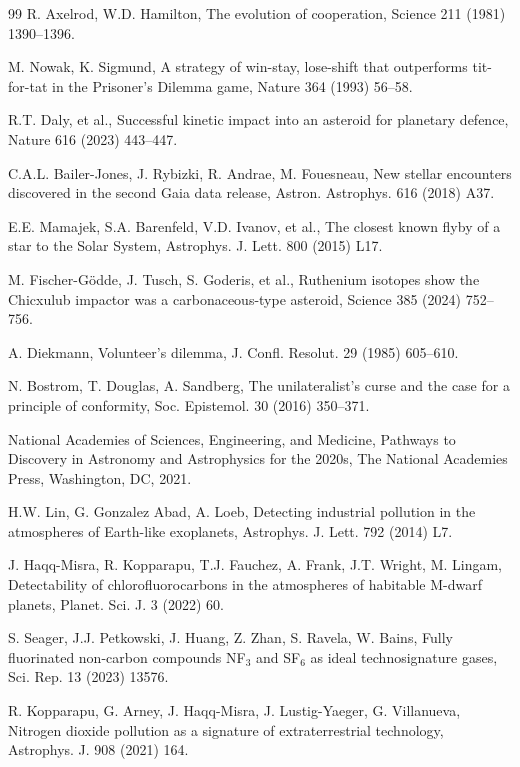 \documentclass[preprint,12pt]{elsarticle}
\theoremstyle{definition}
\begin{document}
\begin{thebibliography}{99}
 R. Axelrod, W.D. Hamilton, The evolution of cooperation, Science 211 (1981) 1390--1396.

 M. Nowak, K. Sigmund, A strategy of win-stay, lose-shift that outperforms tit-for-tat in the Prisoner's Dilemma game, Nature 364 (1993) 56--58.

 R.T. Daly, et al., Successful kinetic impact into an asteroid for planetary defence, Nature 616 (2023) 443--447.

 C.A.L. Bailer-Jones, J. Rybizki, R. Andrae, M. Fouesneau, New stellar encounters discovered in the second Gaia data release, Astron. Astrophys. 616 (2018) A37.

 E.E. Mamajek, S.A. Barenfeld, V.D. Ivanov, et al., The closest known flyby of a star to the Solar System, Astrophys. J. Lett. 800 (2015) L17.

 M. Fischer-G\"odde, J. Tusch, S. Goderis, et al., Ruthenium isotopes show the Chicxulub impactor was a carbonaceous-type asteroid, Science 385 (2024) 752--756.

 A. Diekmann, Volunteer's dilemma, J. Confl. Resolut. 29 (1985) 605--610.

 N. Bostrom, T. Douglas, A. Sandberg, The unilateralist's curse and the case for a principle of conformity, Soc. Epistemol. 30 (2016) 350--371.

 National Academies of Sciences, Engineering, and Medicine, Pathways to Discovery in Astronomy and Astrophysics for the 2020s, The National Academies Press, Washington, DC, 2021.

 H.W. Lin, G. Gonzalez Abad, A. Loeb, Detecting industrial pollution in the atmospheres of Earth-like exoplanets, Astrophys. J. Lett. 792 (2014) L7.

 J. Haqq-Misra, R. Kopparapu, T.J. Fauchez, A. Frank, J.T. Wright, M. Lingam, Detectability of chlorofluorocarbons in the atmospheres of habitable M-dwarf planets, Planet. Sci. J. 3 (2022) 60.

 S. Seager, J.J. Petkowski, J. Huang, Z. Zhan, S. Ravela, W. Bains, Fully fluorinated non-carbon compounds NF$_3$ and SF$_6$ as ideal technosignature gases, Sci. Rep. 13 (2023) 13576.

 R. Kopparapu, G. Arney, J. Haqq-Misra, J. Lustig-Yaeger, G. Villanueva, Nitrogen dioxide pollution as a signature of extraterrestrial technology, Astrophys. J. 908 (2021) 164.


\end{thebibliography}
\end{document}
